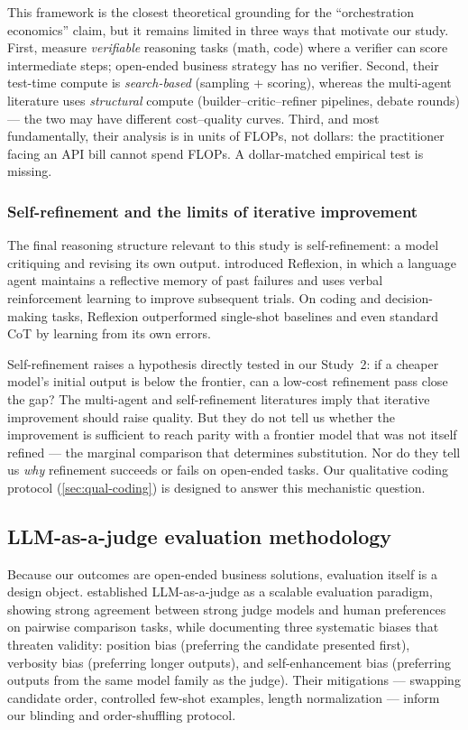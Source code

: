 \documentclass[12pt,a4paper]{article}
\begin{document}
This framework is the closest theoretical grounding for the ``orchestration
economics'' claim, but it remains limited in three ways that motivate our study.
First, \citet{SnellEtAl2024} measure \emph{verifiable} reasoning tasks (math,
code) where a verifier can score intermediate steps; open-ended business
strategy has no verifier. Second, their test-time compute is
\emph{search-based} (sampling + scoring), whereas the multi-agent literature
uses \emph{structural} compute (builder--critic--refiner pipelines, debate
rounds) --- the two may have different cost--quality curves. Third, and most
fundamentally, their analysis is in units of FLOPs, not dollars: the
practitioner facing an API bill cannot spend FLOPs. A dollar-matched empirical
test is missing.

\subsubsection{Self-refinement and the limits of iterative improvement}

The final reasoning structure relevant to this study is self-refinement: a
model critiquing and revising its own output. \citet{ShinnEtAl2023} introduced
Reflexion, in which a language agent maintains a reflective memory of past
failures and uses verbal reinforcement learning to improve subsequent trials.
On coding and decision-making tasks, Reflexion outperformed single-shot
baselines and even standard CoT by learning from its own errors.

Self-refinement raises a hypothesis directly tested in our Study~2: if a cheaper
model's initial output is below the frontier, can a low-cost refinement pass close
the gap? The multi-agent and self-refinement literatures imply that iterative
improvement should raise quality. But they do not tell us whether the
improvement is sufficient to reach parity with a frontier model that was not
itself refined --- the marginal comparison that determines substitution. Nor do
they tell us \emph{why} refinement succeeds or fails on open-ended tasks. Our
qualitative coding protocol (\cref{sec:qual-coding}) is designed to answer this
mechanistic question.

\subsection{LLM-as-a-judge evaluation methodology}

Because our outcomes are open-ended business solutions, evaluation itself is a
design object. \citet{ZhengEtAl2023} established LLM-as-a-judge as a scalable
evaluation paradigm, showing strong agreement between strong judge models and
human preferences on pairwise comparison tasks, while documenting three
systematic biases that threaten validity: position bias (preferring the
candidate presented first), verbosity bias (preferring longer outputs), and
self-enhancement bias (preferring outputs from the same model family as the
judge). Their mitigations --- swapping candidate order, controlled few-shot
examples, length normalization --- inform our blinding and order-shuffling
protocol.
\end{document}
